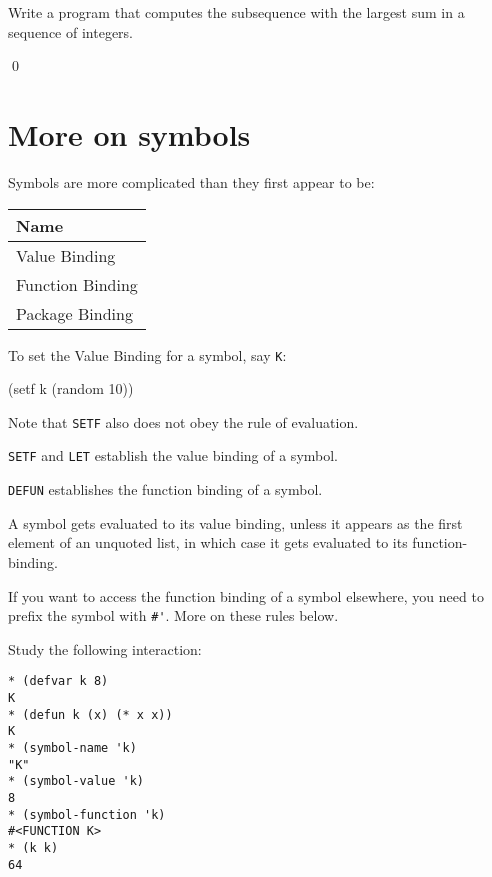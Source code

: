 \documentclass[a4paper,11pt]{article}
\begin{document}
\begin{uexercise}[*]
Write a program that computes the subsequence with the largest sum in
a sequence of integers.

\qed
\end{uexercise}


\noindent\hrulefill
\newpage

\section{More on symbols}

\begin{uenum}
\item Symbols are more complicated than they first appear to be: 

\renewcommand{\arraystretch}{2.4}
\begin{tabular}{|l|}
\hline
{Name} \\ \hline
{Value Binding} \\ \hline
{Function Binding}\\ \hline 
Package Binding\\ \hline
\end{tabular}

\item To set the Value Binding for a symbol, say \Verb+K+:

\begin{lispcode}
(setf k (random 10)) 
\end{lispcode}

\item Note that \Verb+SETF+ also does not obey the rule of evaluation.

\item \Verb+SETF+ and \Verb+LET+ establish the value binding of a symbol.
\item \Verb+DEFUN+ establishes the function binding of a symbol.
\item A symbol gets evaluated to its value binding, unless it appears as the first element of an unquoted list, in which case it gets evaluated to its function-binding.
\item If you want to access the function binding of a symbol elsewhere, you need to prefix the symbol with \Verb+#'+. More on these rules below.
\item Study the following interaction:

\begin{ucodeframe}
\begin{Verbatim}
* (defvar k 8)
K
* (defun k (x) (* x x))
K
* (symbol-name 'k)
"K"
* (symbol-value 'k)
8
* (symbol-function 'k)
#<FUNCTION K>
* (k k)
64
\end{Verbatim}
\end{ucodeframe}


\end{uenum}
\end{document}
